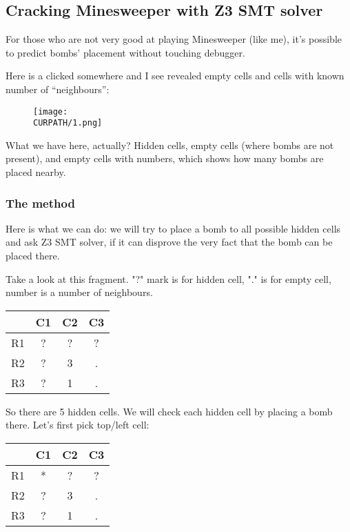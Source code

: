 \subsection{Cracking Minesweeper with Z3 SMT solver}
\label{minesweeper_SMT}

\renewcommand{\CURPATH}{equations/minesweeper_SMT}

For those who are not very good at playing Minesweeper (like me), it's possible to predict bombs' placement without touching debugger.

Here is a clicked somewhere and I see revealed empty cells and cells with known number of ``neighbours'':

\begin{figure}[H]
\centering
\texttt{[image: \\CURPATH/1.png]}
\end{figure}

What we have here, actually? Hidden cells, empty cells (where bombs are not present), and empty cells with numbers, which shows how many bombs are placed nearby.

\subsubsection{The method}

Here is what we can do: we will try to place a bomb to all possible hidden cells and ask Z3 SMT solver, if it can disprove the very fact that the bomb can be placed there.

Take a look at this fragment. "?" mark is for hidden cell, "." is for empty cell, number is a number of neighbours.

\begin{center}
\begin{tabular}{ | c | c | c | c | }
\hline
 & C1 & C2 & C3 \\
\hline
R1 & ? & ? & ? \\
\hline
R2 & ? & 3 & . \\
\hline
R3 & ? & 1 & . \\
\hline
\end{tabular}
\end{center}

So there are 5 hidden cells.
We will check each hidden cell by placing a bomb there.
Let's first pick top/left cell:

\begin{center}
\begin{tabular}{ | c | c | c | c | }
\hline
 & C1 & C2 & C3 \\
\hline
R1 & * & ? & ? \\
\hline
R2 & ? & 3 & . \\
\hline
R3 & ? & 1 & . \\
\hline
\end{tabular}
\end{center}

